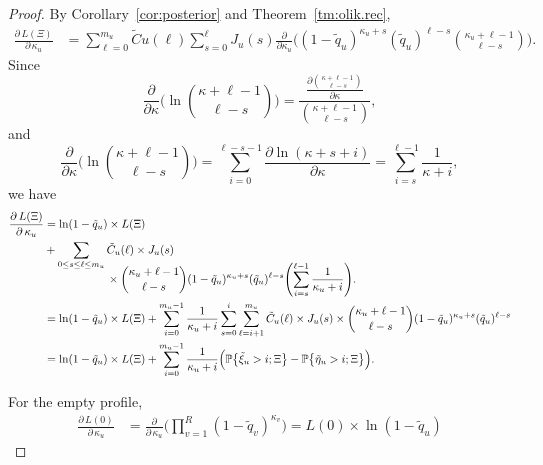 \documentclass{elsarticle}
\newcommand{\condgen}[6]{{#1}#2 #5 #3 #6 #4}
\newcommand{\EXP}{\mathbb{E}}
\newcommand{\PROB}{\mathbb{P}}
\newcommand{\Expclg}[2]{\condgen{\EXP}{\biggl[}{\biggm|}{\biggr]}{#1}{#2}}
\newcommand{\nlik}{C}
\newcommand{\slik}{K}
\newcommand{\solik}{J}
\newcommand{\nx}{u}
\newcommand{\ny}{v}
\newcommand{\nz}{w}
\begin{document}
\begin{proof}
By Corollary~\ref{cor:posterior} and Theorem~\ref{tm:olik.rec},
\begin{align*}
\frac{\partial\, L(\Xi)}{\partial\,\kappa_{\nx}} 
& = \sum_{\ell=0}^{m_{\nx}} \tilde{\nlik}{\nx}(\ell) \sum_{s=0}^{\ell}
	\solik_{\nx}(s) 
	\frac{\partial}{\partial \kappa_{\nx}}
		\biggl((1-\tilde{q}_{\nx})^{\kappa_{\nx}+s}(\tilde{q}_{\nx})^{\ell-s}
			\binom{\kappa_{\nx}+\ell-1}{\ell-s}\biggr).
\end{align*}
Since
\[
\frac{\partial}{\partial \kappa}
\biggl(\ln \binom{\kappa+\ell-1}{\ell-s}\biggr)
= \frac{\frac{\partial \binom{\kappa+\ell-1}{\ell-s}}{\partial \kappa}}{\binom{\kappa+\ell-1}{\ell-s}},
\]
and 
\[
\frac{\partial}{\partial \kappa}
\biggl(\ln \binom{\kappa+\ell-1}{\ell-s}\biggr)
= \sum_{i=0}^{\ell-s-1} \frac{\partial \ln (\kappa+s+i)}{\partial \kappa}
= \sum_{i=s}^{\ell-1} \frac1{\kappa+i},
\]
we have 
\begin{align*}
\frac{\partial\, L(\Xi)}{\partial\,\kappa_{\nx}} 
& = \ln(1-\tilde{q}_{\nx}) \times L(\Xi)
\\ &
	+ \sum_{0\le s\le \ell\le m_{\nx}}
		\begin{aligned}[t]
		&
		\tilde{\nlik}_{\nx}(\ell) \times \solik_{\nx}(s) 
		\\
	& \times
	\binom{\kappa_{\nx}+\ell-1}{\ell-s}(1-\tilde{q}_{\nx})^{\kappa_{\nx}+s}(\tilde{q}_{\nx})^{\ell-s}
	\Biggl(\sum_{i=s}^{\ell-1}\frac1{\kappa_{\nx}+i}\Biggr).
	\end{aligned}
\\
  & = \ln(1-\tilde{q}_{\nx}) \times L(\Xi) 
  	+\sum_{i=0}^{m_{\nx}-1}\frac1{\kappa_{\nx}+i}\sum_{s=0}^{i}\sum_{\ell=i+1}^{m_{\nx}}
  	\tilde{\nlik}_{\nx}(\ell) \times \solik_{\nx}(s) \times \binom{\kappa_{\nx}+\ell-1}{\ell-s}(1-\tilde{q}_{\nx})^{\kappa_{\nx}+s}(\tilde{q}_{\nx})^{\ell-s}
\\
	& = \ln(1-\tilde{q}_{\nx}) \times L(\Xi) 
  	+\sum_{i=0}^{m_{\nx}-1}
  		\frac1{\kappa_{\nx}+i} \Bigl(\PROB\bigl\{\tilde{\xi}_{\nx}> i; \Xi\bigr\}-\PROB\bigl\{\tilde{\eta}_{\nx}> i; \Xi\bigr\}\Bigr).
\end{align*}


For the empty profile, 
\begin{align*}
\frac{\partial\, L(0)}{\partial\,\kappa_{\nx}} & = 
\frac{\partial}{\partial\,\kappa_{\nx}} \Biggl(\prod_{\ny=1}^R (1-\tilde{q}_{\ny})^{\kappa_{\ny}}\Biggr)
= L(0)\times \ln(1-\tilde{q}_{\nx})
\end{align*}
%
\end{proof}
\end{document}
